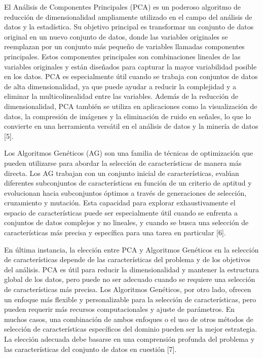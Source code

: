 \documentclass[12pt]{article}
\begin{document}
El Análisis de Componentes Principales (PCA) es un poderoso algoritmo de reducción de dimensionalidad ampliamente utilizado en el campo del análisis de datos y la estadística. Su objetivo principal es transformar un conjunto de datos original en un nuevo conjunto de datos, donde las variables originales se reemplazan por un conjunto más pequeño de variables llamadas componentes principales. Estos componentes principales son combinaciones lineales de las variables originales y están diseñados para capturar la mayor variabilidad posible en los datos. PCA es especialmente útil cuando se trabaja con conjuntos de datos de alta dimensionalidad, ya que puede ayudar a reducir la complejidad y a eliminar la multicolinealidad entre las variables. Además de la reducción de dimensionalidad, PCA también se utiliza en aplicaciones como la visualización de datos, la compresión de imágenes y la eliminación de ruido en señales, lo que lo convierte en una herramienta versátil en el análisis de datos y la minería de datos [5]. \vspace{1cm}

Los Algoritmos Genéticos (AG) son una familia de técnicas de optimización que pueden utilizarse para abordar la selección de características de manera más directa. Los AG trabajan con un conjunto inicial de características, evalúan diferentes subconjuntos de características en función de un criterio de aptitud y evolucionan hacia subconjuntos óptimos a través de generaciones de selección, cruzamiento y mutación. Esta capacidad para explorar exhaustivamente el espacio de características puede ser especialmente útil cuando se enfrenta a conjuntos de datos complejos y no lineales, y cuando se busca una selección de características más precisa y específica para una tarea en particular [6]. \vspace{1cm}

En última instancia, la elección entre PCA y Algoritmos Genéticos en la selección de características depende de las características del problema y de los objetivos del análisis. PCA es útil para reducir la dimensionalidad y mantener la estructura global de los datos, pero puede no ser adecuado cuando se requiere una selección de características más precisa. Los Algoritmos Genéticos, por otro lado, ofrecen un enfoque más flexible y personalizable para la selección de características, pero pueden requerir más recursos computacionales y ajuste de parámetros. En muchos casos, una combinación de ambos enfoques o el uso de otros métodos de selección de características específicos del dominio pueden ser la mejor estrategia. La elección adecuada debe basarse en una comprensión profunda del problema y las características del conjunto de datos en cuestión [7]. \vspace{1cm}
\clearpage
\end{document}
